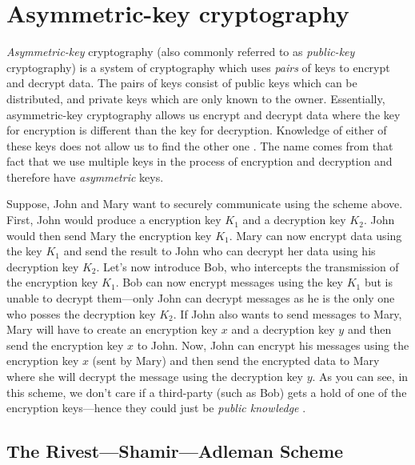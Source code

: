 \chapter{Asymmetric-key cryptography}
\label{Asymmetric-key cryptography} %


\textit{Asymmetric-key} cryptography (also commonly referred to as \textit{public-key} cryptography) is a system of cryptography which uses \textit{pairs} of keys to 
encrypt and decrypt data. The pairs of keys consist of public keys which can be distributed, and private keys which are only known to the owner. Essentially,
asymmetric-key cryptography allows us encrypt and decrypt data where the key for encryption is different than the key for decryption. Knowledge of either
of these keys does not allow us to find the other one \cite{classical_algebra}. The name comes from that fact that we use multiple keys in the process of encryption and decryption
and therefore have \textit{asymmetric} keys.

Suppose, John and Mary want to securely communicate using the scheme above. First, John would produce a encryption key $K_1$ and a decryption key $K_2$. John 
would then send Mary the encryption key $K_1$. Mary can now encrypt data using the key $K_1$ and send the result to John who can decrypt her data using his decryption key
$K_2$. Let's now introduce Bob, who intercepts the transmission of the encryption key $K_1$. Bob can now encrypt messages using the key $K_1$ but is unable to decrypt 
them---only John can decrypt messages as he is the only one who posses the decryption key $K_2$. If John also wants to send messages to Mary, Mary will have to create
an encryption key $x$ and a decryption key $y$ and then send the encryption key $x$ to John. Now, John can encrypt his messages using the encryption key $x$ (sent by Mary)
and then send the encrypted data to Mary where she will decrypt the message using the decryption key $y$. As you can see, in this scheme, we don't care if a third-party 
(such as Bob) gets a hold of one of the encryption keys---hence they could just be \textit{public knowledge} \cite{classical_algebra}. 

\section{The Rivest---Shamir---Adleman Scheme}

